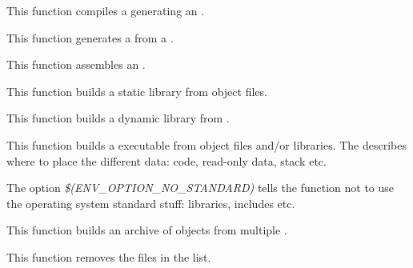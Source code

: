          {
	   This function compiles a  generating an
	   .
	 }

         {
	   This function generates a  from a
	   .
	 }

         {
	   This function assembles an .
	 }

         {
	   This function builds a static library from object files.
	 }

         {
	   This function builds a dynamic library from .
	 }

         {
	   This function builds a executable from object files and/or
	   libraries. The  describes where to
	   place the different data: code, read-only data, stack etc.

	   \-

	   The option \textit{\$(ENV\_OPTION\_NO\_STANDARD)} tells the function
	   not to use the operating system standard stuff: libraries, includes
	   etc.
	 }

         {
	   This function builds an archive of objects from multiple
	   .
	 }

         {
	   This function removes the files in the list.
	 }

